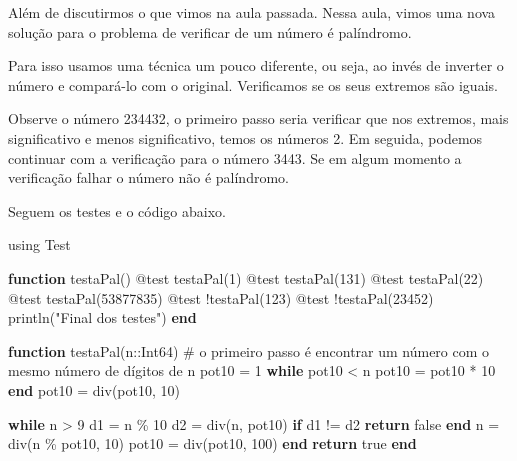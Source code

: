 \documentclass[
  letterpaper,
  DIV=11,
  numbers=noendperiod]{scrreprt}
\newenvironment{Shaded}{\begin{snugshade}}{\end{snugshade}}
\newcommand{\BuiltInTok}[1]{\textcolor[rgb]{0.00,0.23,0.31}{#1}}
\newcommand{\CommentTok}[1]{\textcolor[rgb]{0.37,0.37,0.37}{#1}}
\newcommand{\ConstantTok}[1]{\textcolor[rgb]{0.56,0.35,0.01}{#1}}
\newcommand{\ControlFlowTok}[1]{\textcolor[rgb]{0.00,0.23,0.31}{\textbf{#1}}}
\newcommand{\DataTypeTok}[1]{\textcolor[rgb]{0.68,0.00,0.00}{#1}}
\newcommand{\FloatTok}[1]{\textcolor[rgb]{0.68,0.00,0.00}{#1}}
\newcommand{\FunctionTok}[1]{\textcolor[rgb]{0.28,0.35,0.67}{#1}}
\newcommand{\ImportTok}[1]{\textcolor[rgb]{0.00,0.46,0.62}{#1}}
\newcommand{\KeywordTok}[1]{\textcolor[rgb]{0.00,0.23,0.31}{\textbf{#1}}}
\newcommand{\NormalTok}[1]{\textcolor[rgb]{0.00,0.23,0.31}{#1}}
\newcommand{\OperatorTok}[1]{\textcolor[rgb]{0.37,0.37,0.37}{#1}}
\newcommand{\PreprocessorTok}[1]{\textcolor[rgb]{0.68,0.00,0.00}{#1}}
\newcommand{\StringTok}[1]{\textcolor[rgb]{0.13,0.47,0.30}{#1}}
\begin{document}
Além de discutirmos o que vimos na aula passada. Nessa aula, vimos uma
nova solução para o problema de verificar de um número é palíndromo.

Para isso usamos uma técnica um pouco diferente, ou seja, ao invés de
inverter o número e compará-lo com o original. Verificamos se os seus
extremos são iguais.

Observe o número 234432, o primeiro passo seria verificar que nos
extremos, mais significativo e menos significativo, temos os números 2.
Em seguida, podemos continuar com a verificação para o número 3443. Se
em algum momento a verificação falhar o número não é palíndromo.

Seguem os testes e o código abaixo.

\begin{Shaded}
\begin{Highlighting}[]
\ImportTok{using} \BuiltInTok{Test}

\KeywordTok{function} \FunctionTok{testaPal}\NormalTok{()}
  \PreprocessorTok{@test} \FunctionTok{testaPal}\NormalTok{(}\FloatTok{1}\NormalTok{)}
  \PreprocessorTok{@test} \FunctionTok{testaPal}\NormalTok{(}\FloatTok{131}\NormalTok{)}
  \PreprocessorTok{@test} \FunctionTok{testaPal}\NormalTok{(}\FloatTok{22}\NormalTok{)}
  \PreprocessorTok{@test} \FunctionTok{testaPal}\NormalTok{(}\FloatTok{53877835}\NormalTok{)}
  \PreprocessorTok{@test}\NormalTok{ !}\FunctionTok{testaPal}\NormalTok{(}\FloatTok{123}\NormalTok{)}
  \PreprocessorTok{@test}\NormalTok{ !}\FunctionTok{testaPal}\NormalTok{(}\FloatTok{23452}\NormalTok{)}
  \FunctionTok{println}\NormalTok{(}\StringTok{"Final dos testes"}\NormalTok{)}
\KeywordTok{end}

\KeywordTok{function} \FunctionTok{testaPal}\NormalTok{(n}\OperatorTok{::}\DataTypeTok{Int64}\NormalTok{)}
\CommentTok{\# o primeiro passo é encontrar um número com o mesmo número de dígitos de n}
\NormalTok{  pot10 }\OperatorTok{=} \FloatTok{1}
  \ControlFlowTok{while}\NormalTok{ pot10 }\OperatorTok{\textless{}}\NormalTok{ n}
\NormalTok{    pot10 }\OperatorTok{=}\NormalTok{ pot10 }\OperatorTok{*} \FloatTok{10}
  \ControlFlowTok{end}
\NormalTok{  pot10 }\OperatorTok{=} \FunctionTok{div}\NormalTok{(pot10, }\FloatTok{10}\NormalTok{)}


  \ControlFlowTok{while}\NormalTok{ n }\OperatorTok{\textgreater{}} \FloatTok{9}
\NormalTok{    d1 }\OperatorTok{=}\NormalTok{ n }\OperatorTok{\%} \FloatTok{10}
\NormalTok{    d2 }\OperatorTok{=} \FunctionTok{div}\NormalTok{(n, pot10)}
    \ControlFlowTok{if}\NormalTok{ d1 }\OperatorTok{!=}\NormalTok{ d2}
      \ControlFlowTok{return} \ConstantTok{false}
    \ControlFlowTok{end}
\NormalTok{    n }\OperatorTok{=} \FunctionTok{div}\NormalTok{(n }\OperatorTok{\%}\NormalTok{ pot10, }\FloatTok{10}\NormalTok{)}
\NormalTok{    pot10 }\OperatorTok{=} \FunctionTok{div}\NormalTok{(pot10, }\FloatTok{100}\NormalTok{)}
  \ControlFlowTok{end}
  \ControlFlowTok{return} \ConstantTok{true}
\KeywordTok{end}
\end{Highlighting}
\end{Shaded}
\end{document}
